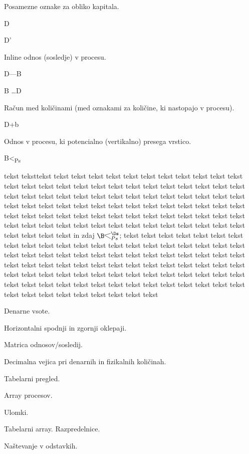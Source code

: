 \documentclass[kapital_02.tex]{subfiles}
\begin{document}
Posamezne oznake za obliko kapitala.

D

D'%

Inline odnos (sosledje) v procesu.

D---B

B \dots D

Račun med količinami (med oznakami za količine, ki nastopajo v procesu).%

D+b

Odnos v procesu, ki potencialno (vertikalno) presega vrstico.

B<\textsubscript{Ps}

tekst teksttekst tekst tekst tekst tekst tekst tekst tekst tekst tekst tekst tekst tekst tekst tekst tekst tekst tekst tekst tekst tekst tekst tekst tekst tekst tekst tekst tekst tekst tekst tekst tekst tekst tekst tekst tekst tekst tekst tekst tekst tekst tekst tekst tekst tekst tekst tekst tekst tekst tekst tekst tekst tekst tekst tekst tekst tekst tekst tekst tekst tekst tekst tekst tekst tekst tekst tekst tekst tekst tekst tekst tekst tekst tekst tekst tekst tekst tekst tekst tekst tekst tekst tekst tekst tekst tekst in zdaj
\(
\B
\begin{tikzpicture}[baseline=-0.33\baselineskip]
    {
        \draw[-]
            (0.87em,0.25em) --
            (0,0) --
            (0.87em,-0.5em);
    }
\end{tikzpicture}
^{\Ds}_{Ps}
\); tekst tekst  tekst tekst tekst tekst tekst tekst tekst tekst tekst tekst tekst tekst tekst tekst tekst tekst tekst tekst tekst tekst tekst tekst tekst tekst tekst tekst tekst tekst tekst tekst tekst tekst tekst tekst tekst tekst tekst tekst tekst tekst tekst tekst tekst tekst tekst tekst tekst tekst tekst tekst tekst tekst tekst tekst tekst tekst tekst tekst tekst tekst tekst tekst tekst tekst tekst tekst tekst tekst tekst tekst tekst tekst tekst tekst tekst tekst tekst tekst tekst tekst tekst tekst tekst tekst

Denarne vsote.

Horizontalni spodnji in zgornji oklepaji.


Matrica odnosov/sosledij.


Decimalna vejica pri denarnih in fizikalnih količinah. %

Tabelarni pregled.


Array procesov.


Ulomki.


Tabelarni array. Razpredelnice.


Naštevanje v odstavkih.

\end{document}
